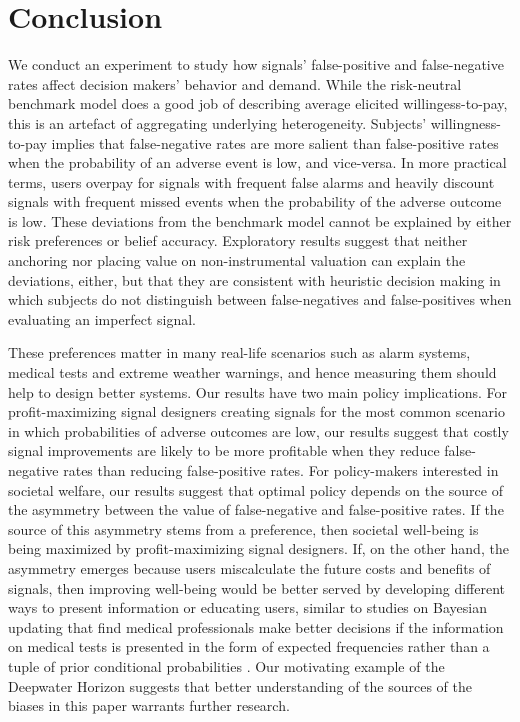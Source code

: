 \documentclass[12pt,a4paper]{article}
\begin{document}
\section{Conclusion}

We conduct an experiment to study how signals' false-positive and false-negative rates affect decision makers' behavior and demand.  While the risk-neutral benchmark model does a good job of describing average elicited willingess-to-pay, this is an artefact of aggregating underlying heterogeneity.  Subjects' willingness-to-pay implies that false-negative rates are more salient than false-positive rates when the probability of an adverse event is low, and vice-versa. In more practical terms, users overpay for signals with frequent false alarms and heavily discount signals with frequent missed events when the probability of the adverse outcome is low. These deviations from the benchmark model cannot be explained by either risk preferences or belief accuracy.  Exploratory results suggest that neither anchoring nor placing value on non-instrumental valuation can explain the deviations, either, but that they are consistent with heuristic decision making in which subjects do not distinguish between false-negatives and false-positives when evaluating an imperfect signal.       

These preferences matter in many real-life scenarios such as alarm systems, medical tests and extreme weather warnings, and hence measuring them should help to design better systems.  Our results have two main policy implications.  For profit-maximizing signal designers creating signals for the most common scenario in which probabilities of adverse outcomes are low, our results suggest that costly signal improvements are likely to be more profitable when they reduce false-negative rates than reducing false-positive rates.  For policy-makers interested in societal welfare, our results suggest that optimal policy depends on the source of the asymmetry between the value of false-negative and false-positive rates.  If the source of this asymmetry stems from a preference, then societal well-being is being maximized by profit-maximizing signal designers.  If, on the other hand, the asymmetry emerges because users miscalculate the future costs and benefits of signals, then improving well-being would be better served by developing different ways to present information or educating users, similar to studies on Bayesian updating that find medical professionals make better decisions if the information on medical tests is presented in the form of expected frequencies rather than a tuple of prior conditional probabilities \citep{hoffrage_natural_2015, mcdowell_meta-analysis_2017}. Our motivating example of the Deepwater Horizon suggests that better understanding of the sources of the biases in this paper warrants further research. 
\end{document}
